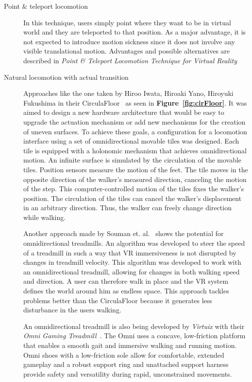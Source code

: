 \begin{description}
	\item[Point \& teleport locomotion] In this technique, users simply point where they want to be in virtual world and they are teleported to that position. As a major advantage, it is not expected to introduce motion sickness since it does not involve any visible translational motion. Advantages and possible alternatives are described in \textit{Point \& Teleport Locomotion Technique for Virtual Reality}~\cite{Bozgeyikli:2016:PTL:2967934.2968105}
	\item[Natural locomotion with actual transition] Approaches like the one taken by Hiroo Iwata, Hiroaki Yano, Hiroyuki Fukushima in their CirculaFloor~\cite{Iwata:2005:CLI:1078037.1079777} as seen in \textbf{Figure~\ref{fig:cirFloor}}. It was aimed to design a new hardware architecture that would be easy to upgrade the actuation mechanism or add new mechanisms for the creation of uneven surfaces. To achieve these goals, a configuration for a locomotion interface using a set of omnidirectional	movable tiles was designed. \newline Each tile is equipped with a holonomic mechanism that achieves omnidirectional motion. An infinite surface is simulated by the circulation of the movable tiles. Position sensors measure the motion of the feet. The tile moves in the opposite direction of the walker’s measured direction, canceling the motion of the step. This computer-controlled motion of the tiles fixes the walker’s position. The circulation of the tiles can cancel the walker’s displacement in an arbitrary direction. Thus, the walker can freely change direction while walking. 
	
	Another approach made by Souman et. al.~\cite{Souman:2010:MVW:1670671.1670675} shows the potential for omnidirectional treadmills. An algorithm was developed to steer the speed of a treadmill in such a way that VR immersiveness is not disrupted by changes in treadmill velocity. This algorithm was developed to work with an omnidirectional treadmill, allowing for changes in both walking speed and direction. A user can therefore walk in place and the VR system defines the world around him as endless space. This approach tackles problems better than the CirculaFloor because it generates less disturbance in the users walking.
	
	An omnidirectional treadmill is also being developed by \textit{Virtuix} with their \textit{Omni Gaming Treadmill~\textcopyright}. The Omni uses a concave, low-friction platform that enables a smooth gait and immersive walking and running motion. Omni shoes with a low-friction sole allow for comfortable, extended gameplay and a robust support ring and unattached support harness provide safety and versatility during rapid, unconstrained movements.
	

\end{description}
